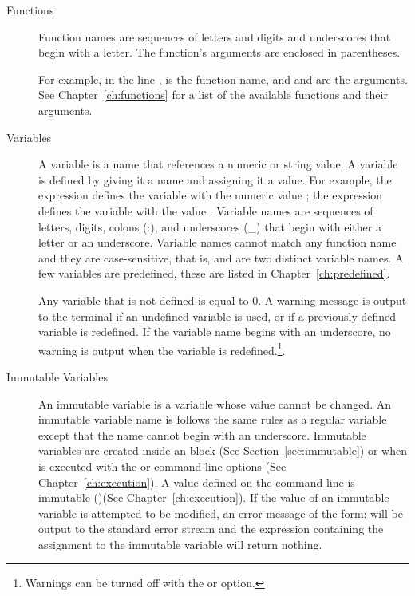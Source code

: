 \begin{description}

\item[Functions] Function names are sequences of letters and digits and underscores
\cmd{(\_)} that begin with a letter. The function's arguments are
enclosed in parentheses.

For example, in the line ,  is the
function name, and  and are the arguments. See
Chapter~\ref{ch:functions} for a list of the available functions and
their arguments.

\item[Variables] A variable is a name that references a numeric or string
value. A variable is defined by giving it a name and assigning it a value. For
example, the expression  defines the variable  with
the numeric value ; the expression 
defines the variable  with the value .
Variable names are sequences of letters, digits, colons (:), and underscores (\_) that begin
with either a letter or an underscore. Variable names cannot match any function
name and they are case-sensitive, that is,  and 
are two distinct variable names. A few variables are predefined, these are listed
in  Chapter~\ref{ch:predefined}.

Any variable that is not defined is equal to 0. A warning message is
output to the terminal if an undefined variable is used, or if a
previously defined variable is redefined. If the variable
name begins with an underscore, no warning is output when the variable
is redefined.\footnote{Warnings can be turned off with the  or
 option.}.

\item[Immutable Variables]\label{immutable} An immutable variable is a
  variable whose value cannot be changed. An immutable variable name
  is follows the same rules as a regular variable except that the name
  cannot begin with an underscore.  Immutable variables are created
  inside an  block (See
  Section~\ref{sec:immutable}) or when \aprepro{} is executed with the
   or  command line options (See
  Chapter~\ref{ch:execution}). A value defined on the command line is
  immutable ()(See Chapter~\ref{ch:execution}). If the value of an
  immutable variable is attempted to be modified, an error message of
  the form:  will be output to the
  standard error stream and the expression containing the assignment
  to the immutable variable will return nothing.


\end{description}
